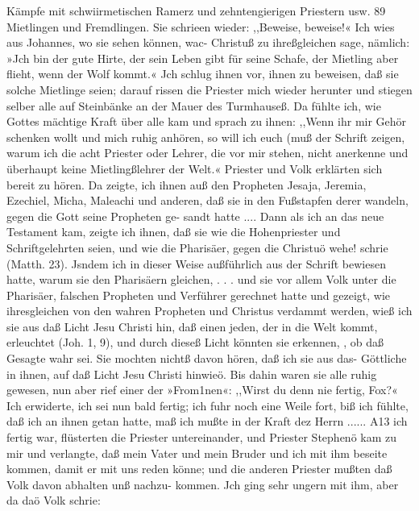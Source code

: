 Kämpfe mit schwiirmetischen Ramerz und zehntengierigen Priestern usw. 89
Mietlingen und Fremdlingen. Sie schrieen wieder: ,,Beweise,
beweise!« Ich wies aus Johannes, wo sie sehen können, wac-
Christuß zu ihreßgleichen sage, nämlich: »Jch bin der gute Hirte,
der sein Leben gibt für seine Schafe, der Mietling aber flieht,
wenn der Wolf kommt.« Jch schlug ihnen vor, ihnen zu beweisen,
daß sie solche Mietlinge seien; darauf rissen die Priester mich
wieder herunter und stiegen selber alle auf Steinbänke
an der Mauer des Turmhauseß. Da fühlte ich, wie Gottes
mächtige Kraft über alle kam und sprach zu ihnen: ,,Wenn ihr
mir Gehör schenken wollt und mich ruhig anhören, so will ich
euch (muß der Schrift zeigen, warum ich die acht Priester oder
Lehrer, die vor mir stehen, nicht anerkenne und überhaupt keine
Mietlingßlehrer der Welt.« Priester und Volk erklärten sich bereit
zu hören. Da zeigte, ich ihnen auß den Propheten Jesaja,
Jeremia, Ezechiel, Micha, Maleachi und anderen, daß sie in den
Fußstapfen derer wandeln, gegen die Gott seine Propheten ge-
sandt hatte ....
Dann als ich an das neue Testament kam, zeigte ich ihnen,
daß sie wie die Hohenpriester und Schriftgelehrten seien, und
wie die Pharisäer, gegen die Christuö wehe! schrie (Matth. 23).
Jsndem ich in dieser Weise außführlich aus der Schrift bewiesen
hatte, warum sie den Pharisäern gleichen, . . . und sie vor allem
Volk unter die Pharisäer, falschen Propheten und Verführer
gerechnet hatte und gezeigt, wie ihresgleichen von den wahren
Propheten und Christus verdammt werden, wieß ich sie aus daß
Licht Jesu Christi hin, daß einen jeden, der in die Welt kommt,
erleuchtet (Joh. 1, 9), und durch dieseß Licht könnten sie erkennen,
, ob daß Gesagte wahr sei. Sie mochten nichtß davon hören, daß
ich sie aus das- Göttliche in ihnen, auf daß Licht Jesu Christi
hinwieö. Bis dahin waren sie alle ruhig gewesen, nun aber
rief einer der »From1nen«: ,,Wirst du denn nie fertig, Fox?«
Ich erwiderte, ich sei nun bald fertig; ich fuhr noch eine Weile
fort, biß ich fühlte, daß ich an ihnen getan hatte, maß ich mußte
in der Kraft dez Herrn ...... A13 ich fertig war, flüsterten
die Priester untereinander, und Priester Stephenö kam zu mir
und verlangte, daß mein Vater und mein Bruder und ich mit
ihm beseite kommen, damit er mit uns reden könne; und die
anderen Priester mußten daß Volk davon abhalten unß nachzu-
kommen. Jch ging sehr ungern mit ihm, aber da daö Volk schrie:

